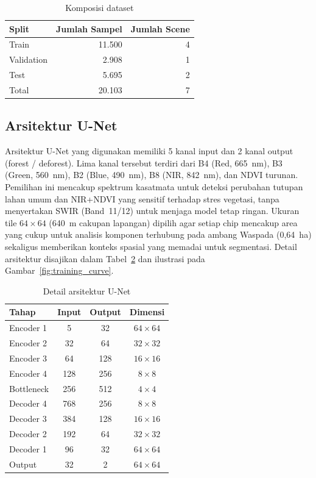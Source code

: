 \documentclass[12pt,a4paper]{article}
\begin{document}
\begin{table}[H]
\centering
\caption{Komposisi dataset}
\label{tab:dataset}
\begin{tabular}{lrr}
\toprule
\textbf{Split} & \textbf{Jumlah Sampel} & \textbf{Jumlah Scene} \\
\midrule
Train & 11.500 & 4 \\
Validation & 2.908 & 1 \\
Test & 5.695 & 2 \\
\midrule
Total & 20.103 & 7 \\
\bottomrule
\end{tabular}
\end{table}

\subsection{Arsitektur U-Net}

Arsitektur U-Net yang digunakan memiliki 5 kanal input dan
2 kanal output (forest / deforest). Lima kanal tersebut terdiri dari
B4 (Red, 665~nm), B3 (Green, 560~nm), B2 (Blue, 490~nm), B8 (NIR, 842~nm),
dan NDVI turunan. Pemilihan ini mencakup spektrum kasatmata untuk deteksi
perubahan tutupan lahan umum dan NIR+NDVI yang sensitif terhadap stres
vegetasi, tanpa menyertakan SWIR (Band~11/12) untuk menjaga model tetap
ringan. Ukuran tile $64 \times 64$ (640~m cakupan lapangan) dipilih agar
setiap chip mencakup area yang cukup untuk analisis komponen terhubung
pada ambang Waspada (0,64~ha) sekaligus memberikan konteks spasial yang
memadai untuk segmentasi. Detail arsitektur disajikan dalam
Tabel~\ref{tab:unet} dan ilustrasi pada Gambar~\ref{fig:training_curve}.

\begin{table}[H]
\centering
\caption{Detail arsitektur U-Net}
\label{tab:unet}
\begin{tabular}{lccc}
\toprule
\textbf{Tahap} & \textbf{Input} & \textbf{Output} & \textbf{Dimensi} \\
\midrule
Encoder 1 & 5 & 32 & $64 \times 64$ \\
Encoder 2 & 32 & 64 & $32 \times 32$ \\
Encoder 3 & 64 & 128 & $16 \times 16$ \\
Encoder 4 & 128 & 256 & $8 \times 8$ \\
Bottleneck & 256 & 512 & $4 \times 4$ \\
Decoder 4 & 768 & 256 & $8 \times 8$ \\
Decoder 3 & 384 & 128 & $16 \times 16$ \\
Decoder 2 & 192 & 64 & $32 \times 32$ \\
Decoder 1 & 96 & 32 & $64 \times 64$ \\
Output & 32 & 2 & $64 \times 64$ \\
\bottomrule
\end{tabular}
\end{table}
\end{document}
